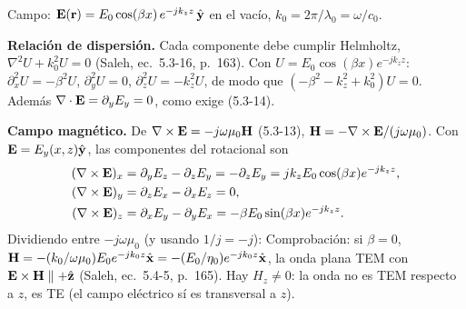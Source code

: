 Campo: $\mathbf E(\mathbf r)=E_0\cos(\beta x)\,e^{-jk_zz}\,\hat{\mathbf y}$ en el vacío, $k_0=2\pi/\lambda_0=\omega/c_0$.

 \textbf{Relación de dispersión.} Cada componente debe cumplir Helmholtz,
$\nabla^2U+k_0^2U=0$ (Saleh, ec.~5.3-16, p.~163). Con $U=E_0\cos(\beta x)e^{-jk_zz}$:
$\partial_x^2U=-\beta^2U$, $\partial_y^2U=0$, $\partial_z^2U=-k_z^2U$, de modo que
$(-\beta^2-k_z^2+k_0^2)U=0$. Además $\nabla\cdot\mathbf E=\partial_yE_y=0$, como exige (5.3-14).

 \textbf{Campo magnético.} De $\nabla\times\mathbf E=-j\omega\mu_0\mathbf H$ (5.3-13), $\mathbf H=-\nabla\times\mathbf E/(j\omega\mu_0)$.
Con $\mathbf E=E_y(x,z)\hat{\mathbf y}$, las componentes del rotacional son
\begin{align*}
(\nabla\times\mathbf E)_x&=\partial_yE_z-\partial_zE_y=-\partial_zE_y=jk_zE_0\cos(\beta x)e^{-jk_zz},\\
(\nabla\times\mathbf E)_y&=\partial_zE_x-\partial_xE_z=0,\\
(\nabla\times\mathbf E)_z&=\partial_xE_y-\partial_yE_x=-\beta E_0\sin(\beta x)e^{-jk_zz}.
\end{align*}
Dividiendo entre $-j\omega\mu_0$ (y usando $1/j=-j$):
Comprobación: si $\beta=0$, $\mathbf H=-(k_0/\omega\mu_0)E_0e^{-jk_0z}\hat{\mathbf x}=-(E_0/\eta_0)e^{-jk_0z}\hat{\mathbf x}$, la onda
plana TEM con $\mathbf E\times\mathbf H\parallel+\hat{\mathbf z}$ (Saleh, ec.~5.4-5, p.~165). Hay $H_z\neq0$: la onda no es TEM
respecto a $z$, es TE (el campo eléctrico sí es transversal a $z$).

